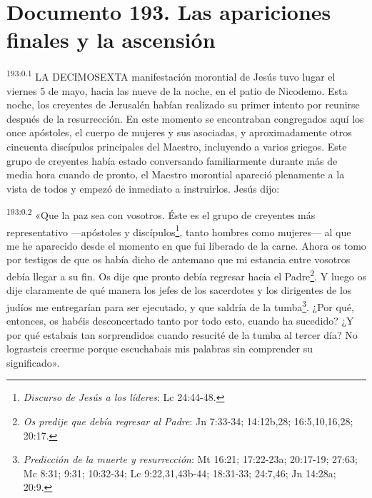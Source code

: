 \chapter{Documento 193. Las apariciones finales y la ascensión}
\par 
\textsuperscript{193:0.1} LA DECIMOSEXTA manifestación morontial de Jesús tuvo lugar el viernes 5 de mayo, hacia las nueve de la noche, en el patio de Nicodemo. Esta noche, los creyentes de Jerusalén habían realizado su primer intento por reunirse después de la resurrección. En este momento se encontraban congregados aquí los once apóstoles, el cuerpo de mujeres y sus asociadas, y aproximadamente otros cincuenta discípulos principales del Maestro, incluyendo a varios griegos. Este grupo de creyentes había estado conversando familiarmente durante más de media hora cuando de pronto, el Maestro morontial apareció plenamente a la vista de todos y empezó de inmediato a instruirlos. Jesús dijo:

\par 
\textsuperscript{193:0.2} «Que la paz sea con vosotros. Éste es el grupo de creyentes más representativo ---apóstoles y discípulos\footnote{\textit{Discurso de Jesús a los líderes}: Lc 24:44-48.}, tanto hombres como mujeres--- al que me he aparecido desde el momento en que fui liberado de la carne. Ahora os tomo por testigos de que os había dicho de antemano que mi estancia entre vosotros debía llegar a su fin. Os dije que pronto debía regresar hacia el Padre\footnote{\textit{Os predije que debía regresar al Padre}: Jn 7:33-34; 14:12b,28; 16:5,10,16,28; 20:17.}. Y luego os dije claramente de qué manera los jefes de los sacerdotes y los dirigentes de los judíos me entregarían para ser ejecutado, y que saldría de la tumba\footnote{\textit{Predicción de la muerte y resurrección}: Mt 16:21; 17:22-23a; 20:17-19; 27:63; Mc 8:31; 9:31; 10:32-34; Lc 9:22,31,43b-44; 18:31-33; 24:7,46; Jn 14:28a; 20:9.}. ¿Por qué, entonces, os habéis desconcertado tanto por todo esto, cuando ha sucedido? ¿Y por qué estabais tan sorprendidos cuando resucité de la tumba al tercer día? No lograsteis creerme porque escuchabais mis palabras sin comprender su significado».

